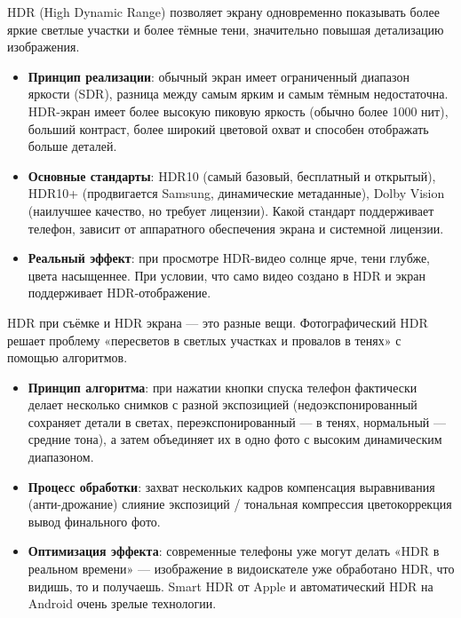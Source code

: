 HDR (High Dynamic Range) позволяет экрану одновременно показывать более яркие светлые участки и более тёмные тени, значительно повышая детализацию изображения.

\begin{itemize}
  \item \textbf{Принцип реализации}: обычный экран имеет ограниченный диапазон яркости (SDR), разница между самым ярким и самым тёмным недостаточна. HDR-экран имеет более высокую пиковую яркость (обычно более 1000 нит), больший контраст, более широкий цветовой охват и способен отображать больше деталей.
  \item \textbf{Основные стандарты}: HDR10 (самый базовый, бесплатный и открытый), HDR10+ (продвигается Samsung, динамические метаданные), Dolby Vision (наилучшее качество, но требует лицензии). Какой стандарт поддерживает телефон, зависит от аппаратного обеспечения экрана и системной лицензии.
  \item \textbf{Реальный эффект}: при просмотре HDR-видео солнце ярче, тени глубже, цвета насыщеннее. При условии, что само видео создано в HDR и экран поддерживает HDR-отображение.
\end{itemize}


HDR при съёмке и HDR экрана — это разные вещи. Фотографический HDR решает проблему «пересветов в светлых участках и провалов в тенях» с помощью алгоритмов.

\begin{itemize}
  \item \textbf{Принцип алгоритма}: при нажатии кнопки спуска телефон фактически делает несколько снимков с разной экспозицией (недоэкспонированный сохраняет детали в светах, переэкспонированный — в тенях, нормальный — средние тона), а затем объединяет их в одно фото с высоким динамическим диапазоном.
  \item \textbf{Процесс обработки}: захват нескольких кадров компенсация выравнивания (анти-дрожание) слияние экспозиций / тональная компрессия цветокоррекция вывод финального фото.
  \item \textbf{Оптимизация эффекта}: современные телефоны уже могут делать «HDR в реальном времени» — изображение в видоискателе уже обработано HDR, что видишь, то и получаешь. Smart HDR от Apple и автоматический HDR на Android очень зрелые технологии.
\end{itemize}


